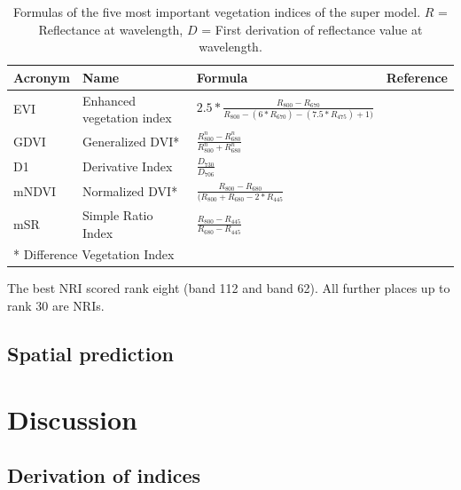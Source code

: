 \documentclass[review]{elsarticle}
\begin{document}
\begin{table}[t!]
\centering
\caption[t]{Formulas of the five most important vegetation indices of the super model. $R$ = Reflectance at wavelength, $D$ = First derivation of reflectance value at wavelength.}
\begingroup\footnotesize
\begin{tabular}{llll}
	\\
	Acronym & Name                      & Formula                                                            & Reference                                                 \\
	\hline
	EVI     & Enhanced vegetation index & $2.5*\frac{R_{800}-R_{670}}{R_{800}-(6*R_{670})-(7.5*R_{475})+1)}$ & \cite{hueteComparisonVegetationIndices1997}               \\
	GDVI    & Generalized DVI*          & $\frac{R_{800}^n-R_{680}^n}{R_{800}^n+R_{680}^n}$                  & \cite{wuEstimatingChlorophyllContent2008}                 \\
	D1      & Derivative Index          & $\frac{D_{730}}{D_{706}}$                                          & \cite{zarco-tejadaSteadystateChlorophyllFluorescence2003} \\
	mNDVI   & Normalized DVI*           & $  \frac{R_{800}-R_{680}}{(R_{800}+R_{680}-2*R_{445}}$             & \cite{simsRelationshipsLeafPigment2002}                   \\
	mSR     & Simple Ratio Index        & $\frac{R_{800}-R_{445}}{R_{680}-R_{445}}$                          & \cite{simsRelationshipsLeafPigment2002}                   \\
	\bottomrule
	\multicolumn{2}{l}{\small{* Difference Vegetation Index}}
\end{tabular}
\endgroup
\label{tab:most_imp_vars}
\end{table}

\noindent The best NRI scored rank eight (band 112 and band 62).
All further places up to rank 30 are NRIs.

\subsection{Spatial prediction}




\section{Discussion}

\subsection{Derivation of indices}
\end{document}
